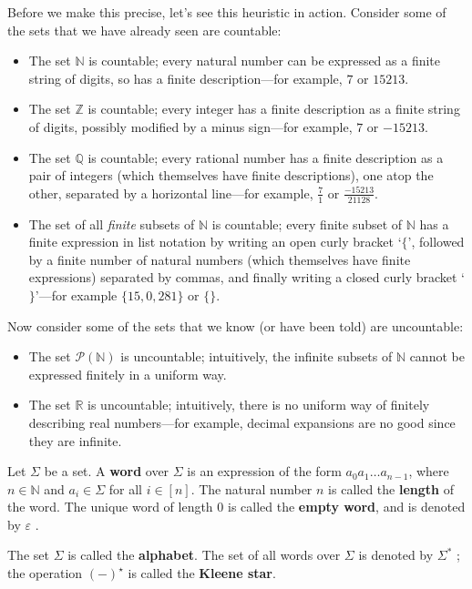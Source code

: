 Before we make this precise, let's see this heuristic in action. Consider some of the sets that we have already seen are countable:
\begin{itemize}
\item The set $\mathbb{N}$ is countable; every natural number can be expressed as a finite string of digits, so has a finite description---for example, $7$ or $15213$.
\item The set $\mathbb{Z}$ is countable; every integer has a finite description as a finite string of digits, possibly modified by a minus sign---for example, $7$ or $-15213$.
\item The set $\mathbb{Q}$ is countable; every rational number has a finite description as a pair of integers (which themselves have finite descriptions), one atop the other, separated by a horizontal line---for example, $\frac{7}{1}$ or $\frac{-15213}{21128}$.
\item The set of all \textit{finite} subsets of $\mathbb{N}$ is countable; every finite subset of $\mathbb{N}$ has a finite expression in list notation by writing an open curly bracket `$\{$', followed by a finite number of natural numbers (which themselves have finite expressions) separated by commas, and finally writing a closed curly bracket `$\}$'---for example $\{ 15, 0, 281 \}$ or $\{ \}$.
\end{itemize}

Now consider some of the sets that we know (or have been told) are uncountable:
\begin{itemize}
\item The set $\mathcal{P}(\mathbb{N})$ is uncountable; intuitively, the infinite subsets of $\mathbb{N}$ cannot be expressed finitely in a uniform way.
\item The set $\mathbb{R}$ is uncountable; intuitively, there is no uniform way of finitely describing real numbers---for example, decimal expansions are no good since they are infinite.
\end{itemize}

\begin{definition}
\label{defKleeneStar}
Let $\Sigma$ be a set. A \textbf{word} over $\Sigma$ is an expression of the form $a_0 a_1 \dots a_{n-1}$, where $n \in \mathbb{N}$ and $a_i \in \Sigma$ for all $i \in [n]$. The natural number $n$ is called the \textbf{length} of the word. The unique word of length $0$ is called the \textbf{empty word}, and is denoted by $\varepsilon$ .

The set $\Sigma$ is called the \textbf{alphabet}. The set of all words over $\Sigma$ is denoted by $\Sigma^*$ ; the operation $(-)^{\star}$ is called the \textbf{Kleene star}.
\end{definition}

